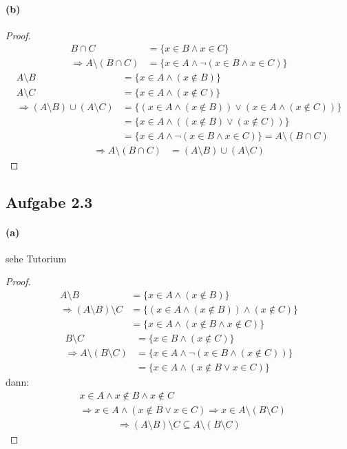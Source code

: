 \paragraph{(b)}
\begin{proof}
$ $\newline
\begin{align}
B\cap C&=\{x\in B\wedge x\in C\}\\
\Rightarrow A\setminus(B\cap C)&=\{x\in A\wedge\neg(x\in B\wedge x\in C)\}
\end{align}
\begin{align}
A\setminus B&=\{x\in A\wedge(x\notin B)\}\\
A\setminus C&=\{x\in A\wedge(x\notin C)\}\\
\Rightarrow (A\setminus B)\cup(A\setminus C)&=\{(x\in A\wedge(x\notin B))\vee(x\in A\wedge(x\notin C))\}\\
&=\{x\in A\wedge((x\notin B)\vee(x\notin C))\}\\
&=\{x\in A\wedge\neg(x\in B\wedge x\in C)\}=A\setminus(B\cap C)
\end{align}
\begin{align}
\Rightarrow A\setminus(B\cap C)&=(A\setminus B)\cup(A\setminus C)
\end{align}
\end{proof}

\newpage

\subsection{Aufgabe 2.3}

\paragraph{(a)}
\begin{remark}
sehe Tutorium
\end{remark}
\begin{proof}
$ $\newline
\begin{align}
A\setminus B&=\{x\in A\wedge(x\notin B)\}\\
\Rightarrow (A\setminus B)\setminus C&=\{(x\in A\wedge(x\notin B))\wedge(x\notin C)\}\\
&=\{x\in A\wedge(x\notin B\wedge x\notin C)\}
\end{align}
\begin{align}
B\setminus C&=\{x\in B\wedge(x\notin C)\}\\
\Rightarrow A\setminus(B\setminus C)&=\{x\in A\wedge\neg(x\in B\wedge(x\notin C))\}\\
&=\{x\in A\wedge(x\notin B\vee x\in C)\}
\end{align}
dann:
\begin{align}
&x\in A\wedge x\notin B\wedge x\notin C\\
&\Rightarrow x\in A\wedge(x\notin B\vee x\in C)\Rightarrow x\in A\setminus(B\setminus C)
\end{align}
\begin{align}
\Rightarrow (A\setminus B)\setminus C\subseteq A\setminus(B\setminus C)
\end{align}
\end{proof}


